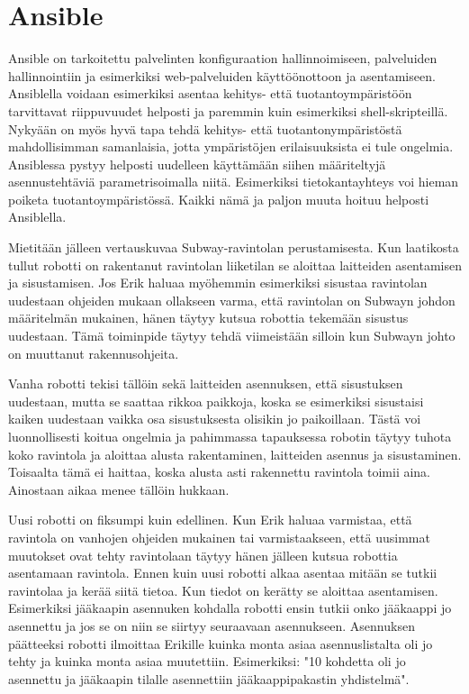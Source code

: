 \chapter{Ansible}

Ansible on tarkoitettu palvelinten konfiguraation hallinnoimiseen, palveluiden hallinnointiin ja esimerkiksi web-palveluiden käyttöönottoon ja asentamiseen. Ansiblella voidaan esimerkiksi asentaa kehitys- että tuotantoympäristöön tarvittavat riippuvuudet helposti ja paremmin kuin esimerkiksi shell-skripteillä. Nykyään on myös hyvä tapa tehdä kehitys- että tuotantonympäristöstä mahdollisimman samanlaisia, jotta ympäristöjen erilaisuuksista ei tule ongelmia. Ansiblessa pystyy helposti uudelleen käyttämään siihen määriteltyjä asennustehtäviä parametrisoimalla niitä. Esimerkiksi tietokantayhteys voi hieman poiketa tuotantoympäristössä. Kaikki nämä ja paljon muuta hoituu helposti Ansiblella.

Mietitään jälleen vertauskuvaa Subway-ravintolan perustamisesta. Kun laatikosta tullut robotti on rakentanut ravintolan liiketilan se aloittaa laitteiden asentamisen ja sisustamisen. Jos Erik haluaa myöhemmin esimerkiksi sisustaa ravintolan uudestaan ohjeiden mukaan ollakseen varma, että ravintolan on Subwayn johdon määritelmän mukainen, hänen täytyy kutsua robottia tekemään sisustus uudestaan. Tämä toiminpide täytyy tehdä viimeistään silloin kun Subwayn johto on muuttanut rakennusohjeita.

Vanha robotti tekisi tällöin sekä laitteiden asennuksen, että sisustuksen uudestaan, mutta se saattaa rikkoa paikkoja, koska se esimerkiksi sisustaisi kaiken uudestaan vaikka osa sisustuksesta olisikin jo paikoillaan. Tästä voi luonnollisesti koitua ongelmia ja pahimmassa tapauksessa robotin täytyy tuhota koko ravintola ja aloittaa alusta rakentaminen, laitteiden asennus ja sisustaminen. Toisaalta tämä ei haittaa, koska alusta asti rakennettu ravintola toimii aina. Ainostaan aikaa menee tällöin hukkaan.

Uusi robotti on fiksumpi kuin edellinen. Kun Erik haluaa varmistaa, että ravintola on vanhojen ohjeiden mukainen tai varmistaakseen, että uusimmat muutokset ovat tehty ravintolaan täytyy hänen jälleen kutsua robottia asentamaan ravintola. Ennen kuin uusi robotti alkaa asentaa mitään se tutkii ravintolaa ja kerää siitä tietoa. Kun tiedot on kerätty se aloittaa asentamisen. Esimerkiksi jääkaapin asennuken kohdalla robotti ensin tutkii onko jääkaappi jo asennettu ja jos se on niin se siirtyy seuraavaan asennukseen. Asennuksen päätteeksi robotti ilmoittaa Erikille kuinka monta asiaa asennuslistalta oli jo tehty ja kuinka monta asiaa muutettiin. Esimerkiksi: "10 kohdetta oli jo asennettu ja jääkaapin tilalle asennettiin jääkaappipakastin yhdistelmä".

